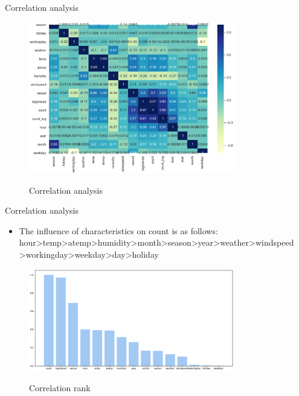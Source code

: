 \documentclass[
 size=14pt,
 paper=smartboard,  %
 mode=present, 		%
 display=slides, 	%
 style=tuliplab,  	%
 pauseslide,
 fleqn,leqno]{powerdot}
\begin{document}
\begin{slide}{Correlation analysis}
  \vspace{-1cm}
  \begin{figure}
  \centering
  \includegraphics[width=0.8\textwidth]{figures//cor.eps}\\
  \caption{Correlation analysis} \label{framework}
\end{figure}


\end{slide}
\begin{slide}[toc=,bm=]{Correlation analysis}
  \begin{itemize}
    \item
    The influence of characteristics on count is as follows: 
    hour>temp>atemp>humidity>month>season>year>weather>windspeed
    >workingday>weekday>day>holiday
    \end{itemize}
  \vspace{-0.8cm}
  \begin{figure}
    \centering
    \includegraphics[width=0.8\textwidth]{figures//cor_rank.eps}\\
    \caption{Correlation rank} \label{framework}
  \end{figure}
  
  
\end{slide}
  
\end{document}

